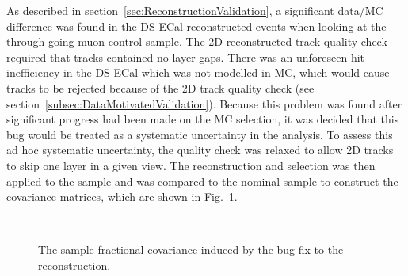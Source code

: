 As described in section~\ref{sec:ReconstructionValidation}, a significant data/MC difference was found in the DS ECal reconstructed events when looking at the through-going muon control sample.  The 2D reconstructed track quality check required that tracks contained no layer gaps.  There was an unforeseen hit inefficiency in the DS ECal which was not modelled in MC, which would cause tracks to be rejected because of the 2D track quality check (see section~\ref{subsec:DataMotivatedValidation}).  Because this problem was found after significant progress had been made on the MC selection, it was decided that this bug would be treated as a systematic uncertainty in the analysis.  To assess this ad hoc systematic uncertainty, the quality check was relaxed to allow 2D tracks to skip one layer in a given view.  The reconstruction and selection was then applied to the sample and was compared to the nominal sample to construct the covariance matrices, which are shown in Fig.~\ref{fig:ECalHoughBugCovarianceMatrices}.
\begin{figure}
  \centering
  \\
  \caption{The sample fractional covariance induced by the bug fix to the reconstruction.}
  \label{fig:ECalHoughBugCovarianceMatrices}
\end{figure}
